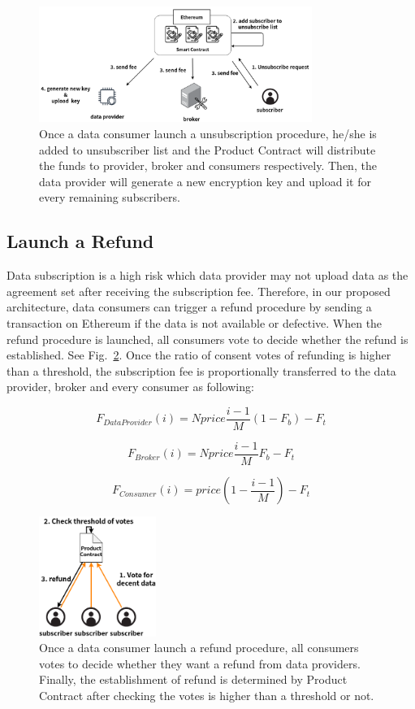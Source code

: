\documentclass[conference]{IEEEtran}
\begin{document}
\begin{figure}[h]
    \centering
    \includegraphics[width=3.5in]{unsubscribe}
    \caption{Once a data consumer launch a unsubscription procedure, he/she is added to unsubscriber list and the Product Contract will distribute the funds to provider, broker and consumers respectively. Then, the data provider will generate a new encryption key and upload it for every remaining subscribers.}
    \label{fig:unsubscribe}
\end{figure}

\subsection{Launch a Refund}
Data subscription is a high risk which data provider may not upload data as the agreement set after receiving the subscription fee. Therefore, in our proposed architecture, data consumers can trigger a refund procedure by sending a transaction on Ethereum if the data is not available or defective. When the refund procedure is launched, all consumers vote to decide whether the refund is established. See Fig.~\ref{fig:refund}. Once the ratio of consent votes of refunding is higher than a threshold, the subscription fee is proportionally transferred to the data provider, broker and every consumer as following:

\begin{equation}
    F_{DataProvider}(i) = Nprice \frac{i-1}{M} (1-F_{b}) -F_{t}
\end{equation}

\begin{equation}
    F_{Broker}(i) = Nprice \frac{i-1}{M} F_{b} -F_{t}
\end{equation}

\begin{equation}
    F_{Consumer}(i) = price (1-\frac{i-1}{M}) -F_{t}
\end{equation}

\begin{figure}[h]
    \centering
    \includegraphics[width=1.5in]{refund}
    \caption{Once a data consumer launch a refund procedure, all consumers votes to decide whether they want a refund from data providers. Finally, the establishment of refund is determined by Product Contract after checking the votes is higher than a threshold or not.}
    \label{fig:refund}
\end{figure}
\end{document}
